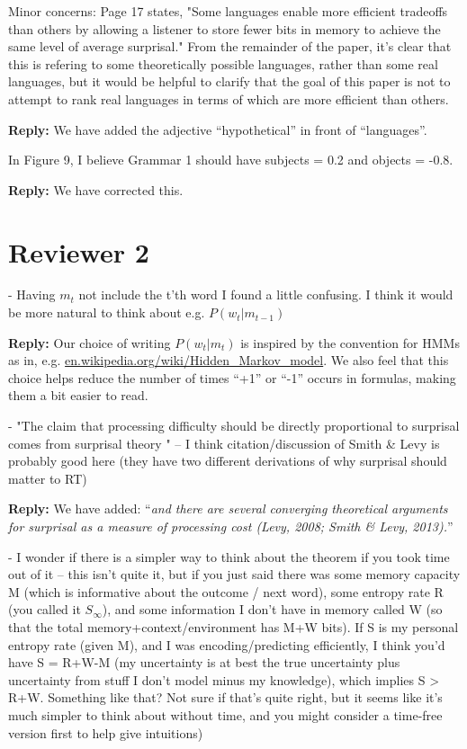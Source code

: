 \documentclass{article}[11pt,a4paper,oneside]
\newenvironment{reply}
  {\par\medskip
   \color{blue}%
   \begin{framed}
   \textbf{Reply: }\ignorespaces}
 {\end{framed}
  \medskip}
\begin{document}
Minor concerns:
Page 17 states, "Some languages enable more efficient tradeoffs than others by allowing a listener to store fewer bits in memory to achieve the same level of average surprisal." From the remainder of the paper, it's clear that this is refering to some theoretically possible languages, rather than some real languages, but it would be helpful to clarify that the goal of this paper is not to attempt to rank real languages in terms of which are more efficient than others.

\begin{reply}
We have added the adjective ``hypothetical'' in front of ``languages''.
\end{reply}

In Figure 9, I believe Grammar 1 should have subjects = 0.2 and objects = -0.8.

\begin{reply}
We have corrected this.
\end{reply}


\section{Reviewer 2}

- Having $m_t$ not include the t'th word I found a little confusing. I think it would be more natural to think about e.g. $P(w_t | m_{t-1})$

\begin{reply}
	Our choice of writing $P(w_t | m_{t})$ is inspired by the convention for HMMs as in, e.g. \url{en.wikipedia.org/wiki/Hidden_Markov_model}.
	We also feel that this choice helps reduce the number of times ``+1'' or ``-1'' occurs in formulas, making them a bit easier to read.
\end{reply}

- "The claim that processing difficulty should be directly proportional to surprisal comes from surprisal theory " -- I think citation/discussion of Smith \& Levy is probably good here (they have two different derivations of why surprisal should matter to RT)

\begin{reply}
	We have added: ``\textit{and there are several converging theoretical arguments for surprisal as a measure of processing cost (Levy, 2008; Smith \& Levy, 2013).}''
\end{reply}

- I wonder if there is a simpler way to think about the theorem if you took time out of it -- this isn't quite it, but if you just said there was some memory capacity M (which is informative about the outcome / next word), some entropy rate R (you called it $S_\infty$), and some information I don't have in memory called W (so that the total memory+context/environment has M+W bits). If S is my personal entropy rate (given M), and I was encoding/predicting efficiently, I think you'd have S = R+W-M (my uncertainty is at best the true uncertainty plus uncertainty from stuff I don't model minus my knowledge), which implies S > R+W. Something like that? Not sure if that's quite right, but it seems like it's much simpler to think about without time, and you might consider a time-free version first to help give intuitions)
\end{document}
